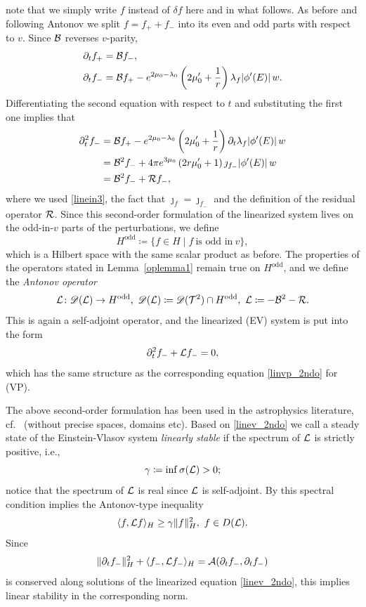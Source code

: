 \documentclass[11pt]{article}
\begin{document}
note that we simply write $f$ instead of $\delta f$ here
and in what follows.
As before and following {\sc Antonov} we split $f=f_+ + f_-$ into
its even and odd parts with respect to $v$. Since ${\cal B}$ reverses $v$-parity,
\begin{align*}
  \partial_t f_+
  &=
  {\cal B} f_-,\\
  \partial_t f_-
  &=
  {\cal B} f_+ 
  - e^{2\mu_0-\lambda_0} \left(2\mu_0'+\frac{1}{r}\right)
  \lambda_{f} |\phi'(E)|\, w.
\end{align*}
Differentiating the second equation with respect to $t$ and substituting the
first one implies that
\begin{align*}
  \partial^2_t f_-
  &=
  {\cal B} f_+- e^{2\mu_0-\lambda_0} \left(2\mu_0'+\frac{1}{r}\right)
  \partial_t \lambda_{f} |\phi'(E)|\, w\\
 &=
  {\cal B}^2 f_- + 4 \pi e^{3\mu_0} \left(2 r \mu_0'+1\right)
  \jmath_{f_-} |\phi'(E)|\, w\\
  &=
  {\cal B}^2 f_- + {{\cal R}} f_-,
\end{align*}
where we used \eqref{linein3}, the fact that $\jmath_f = \jmath_{f_-}$ and the
definition of the residual operator ${{\cal R}}$.
Since this second-order formulation of the
linearized system lives on the odd-in-$v$ parts of the perturbations, we
define
\[
H^\mathrm{odd} \coloneqq \{f\in H \mid f\ \mbox{is odd in}\ v\},
\]
which is a Hilbert space with the same scalar product as before.
The properties of the operators stated in Lemma~\ref{oplemma1} remain
true on $H^\mathrm{odd}$, and we define the
{\em Antonov operator}
\[
\L \colon \Ds(\L) \to H^\mathrm{odd},\  
\Ds(\L)\coloneqq \Ds(\T^2)\cap H^\mathrm{odd},\ 
\L\coloneqq -\B^2 - \Ro.
\]
This is again a self-adjoint operator, and the linearized (EV) system
is put into the form
\begin{equation}\label{linev_2ndo}
  \partial^2_{t} f_- + {\cal L} f_- = 0,
\end{equation}
which has the same structure as the corresponding equation \eqref{linvp_2ndo}
for (VP).

The above second-order formulation has been used in the astrophysics literature,
cf.~\cite{Ip69,Ip69b,IT68} (without precise spaces, domains etc).
Based on \eqref{linev_2ndo} we call
a steady state of the Einstein-Vlasov system
{\em linearly stable} if the spectrum of ${\cal L}$ is strictly positive, i.e., 
\[ 
\gamma\coloneqq\inf \sigma({\cal L}) > 0; 
\]
notice that the spectrum of ${\cal L}$ is real since ${\cal L}$ is self-adjoint.
By \cite[Prop.~5.12]{HiSi} this spectral condition
implies the Antonov-type inequality
\[ 
\langle f, {\cal L} f\rangle_H \geq \gamma \|f\|_H^2,\
f\in D ({\cal L}).
\]
Since
\[ 
\|\partial_t f_-\|_H^2 + \langle f_-, {\cal L} f_-\rangle_H
= {\cal A}(\partial_t f_-,\partial_t f_-)
\]
is conserved along solutions of the linearized equation	\eqref{linev_2ndo},
this implies linear stability in the corresponding norm.
\end{document}
